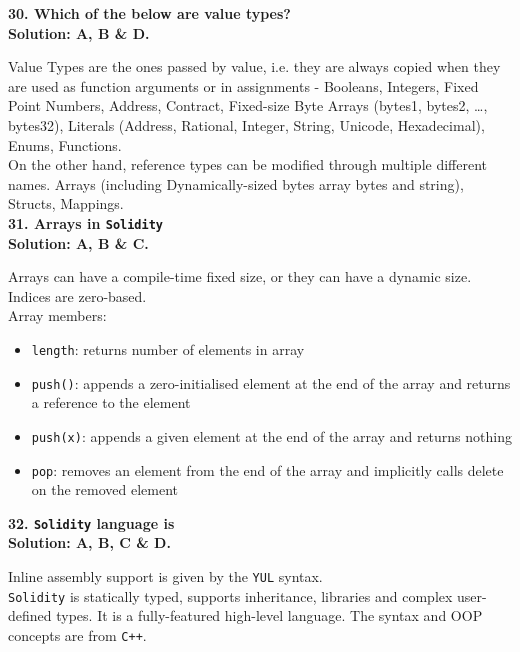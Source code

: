 \textbf{30. Which of the below are value types?}\label{sec:exam2_q30}\\

\textbf{Solution: A, B \& D.}

Value Types are the ones passed by value, i.e. they are always copied when they are used as function arguments or in assignments - Booleans, Integers, Fixed Point Numbers, Address, Contract, Fixed-size Byte Arrays (bytes1, bytes2, \dots, bytes32), Literals (Address, Rational, Integer, String, Unicode, Hexadecimal), Enums, Functions.\\

On the other hand, reference types can be modified through multiple different names.
Arrays (including Dynamically-sized bytes array bytes and string), Structs, Mappings.\\

\textbf{31. Arrays in \texttt{Solidity}}\label{sec:exam2_q31}\\

\textbf{Solution: A, B \& C.}

Arrays can have a compile-time fixed size, or they can have a dynamic size.
Indices are zero-based.\\

Array members:

\begin{itemize}
    \item\verb|length|: returns number of elements in array
    \item\verb|push()|: appends a zero-initialised element at the end of the array and returns a reference to the element
    \item\verb|push(x)|: appends a given element at the end of the array and returns nothing
    \item\verb|pop|: removes an element from the end of the array and implicitly calls delete on the removed element
\end{itemize}


\textbf{32. \texttt{Solidity} language is}\label{sec:exam2_q32}\\

\textbf{Solution: A, B, C \& D.}

Inline assembly support is given by the \verb|YUL| syntax.\\
\verb|Solidity| is statically typed, supports inheritance, libraries and complex user-defined types.
It is a fully-featured high-level language.
The syntax and OOP concepts are from \verb|C++|.